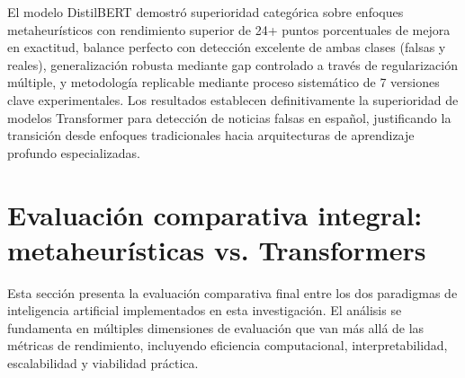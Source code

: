 \begin{table}[htbp]
\centering
{}
\caption{Comparación DistilBERT vs. mejor algoritmo metaheurístico.}
\label{tab:comparacion_final}
\end{table}

El modelo DistilBERT demostró superioridad categórica sobre enfoques metaheurísticos con rendimiento superior de 24+ puntos porcentuales de mejora en exactitud, balance perfecto con detección excelente de ambas clases (falsas y reales), generalización robusta mediante gap controlado a través de regularización múltiple, y metodología replicable mediante proceso sistemático de 7 versiones clave experimentales. Los resultados establecen definitivamente la superioridad de modelos Transformer para detección de noticias falsas en español, justificando la transición desde enfoques tradicionales hacia arquitecturas de aprendizaje profundo especializadas.

\section{Evaluación comparativa integral: metaheurísticas vs. Transformers}
\label{sec:evaluacion_comparativa_integral}

Esta sección presenta la evaluación comparativa final entre los dos paradigmas de inteligencia artificial implementados en esta investigación. El análisis se fundamenta en múltiples dimensiones de evaluación que van más allá de las métricas de rendimiento, incluyendo eficiencia computacional, interpretabilidad, escalabilidad y viabilidad práctica.

